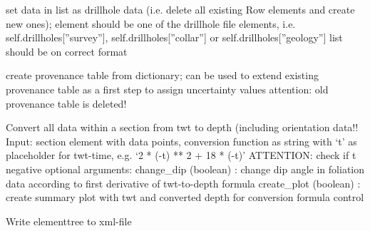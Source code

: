 \documentclass[letterpaper,10pt,english]{sphinxmanual}
\begin{document}
\begin{fulllineitems}
\begin{fulllineitems}
\end{fulllineitems}


\begin{fulllineitems}
\label{pygeomod:pygeomod.geomodeller_xml_obj.GeomodellerClass.set_drillhole_data}
set data in list as drillhole data (i.e. delete all
existing Row elements and create new ones); 
element should
be one of the drillhole file elements, i.e. 
self.drillholes{[}''survey''{]}, self.drillholes{[}''collar''{]} 
or self.drillholes{[}''geology''{]} 
list should be on correct format

\end{fulllineitems}


\begin{fulllineitems}
\label{pygeomod:pygeomod.geomodeller_xml_obj.GeomodellerClass.set_provenance_table}
create provenance table from dictionary; can be used to extend existing
provenance table as a first step to assign uncertainty values
attention: old provenance table is deleted!

\end{fulllineitems}


\begin{fulllineitems}
\label{pygeomod:pygeomod.geomodeller_xml_obj.GeomodellerClass.twt_to_depth}
Convert all data within a section from twt to depth (including
orientation data!!
Input: section element with data points, conversion function as
string with `t' as placeholder for twt-time, e.g. `2 * (-t) ** 2 + 18 * (-t)'
ATTENTION: check if t negative
optional arguments: 
change\_dip (boolean) : change dip angle in foliation data
according to first derivative of twt-to-depth formula
create\_plot (boolean) : create summary plot with twt and converted depth
for conversion formula control

\end{fulllineitems}


\begin{fulllineitems}
\label{pygeomod:pygeomod.geomodeller_xml_obj.GeomodellerClass.write_xml}
Write elementtree to xml-file

\end{fulllineitems}


\end{fulllineitems}
\end{document}
